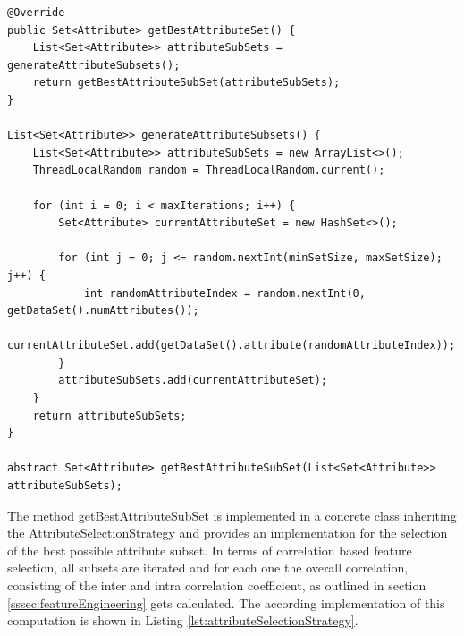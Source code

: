 \begin{lstlisting}[caption={AttributeSelectionStrategy}, label={lst:selectionstrategy}]
@Override
public Set<Attribute> getBestAttributeSet() {
	List<Set<Attribute>> attributeSubSets = generateAttributeSubsets();
	return getBestAttributeSubSet(attributeSubSets);
}

List<Set<Attribute>> generateAttributeSubsets() {
	List<Set<Attribute>> attributeSubSets = new ArrayList<>();
	ThreadLocalRandom random = ThreadLocalRandom.current();
	
	for (int i = 0; i < maxIterations; i++) {
		Set<Attribute> currentAttributeSet = new HashSet<>();
		
		for (int j = 0; j <= random.nextInt(minSetSize, maxSetSize); j++) {
			int randomAttributeIndex = random.nextInt(0, getDataSet().numAttributes());
			currentAttributeSet.add(getDataSet().attribute(randomAttributeIndex));
		}
		attributeSubSets.add(currentAttributeSet);
	}
	return attributeSubSets;
}

abstract Set<Attribute> getBestAttributeSubSet(List<Set<Attribute>> attributeSubSets);
\end{lstlisting}

The method getBestAttributeSubSet is implemented in a concrete class inheriting the AttributeSelectionStrategy and provides an implementation for the selection of the best possible attribute subset. In terms of correlation based feature selection, all subsets are iterated and for each one the overall correlation, consisting of the inter and intra correlation coefficient, as outlined in section \ref{sssec:featureEngineering} gets calculated. The according implementation of this computation is shown in Listing \ref{lst:attributeSelectionStrategy}. 

